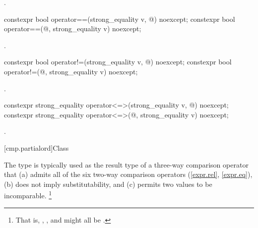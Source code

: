 \begin{itemdescr}
\pnum
\returns
{}.
\end{itemdescr}

%
\begin{itemdecl}
constexpr bool operator==(strong_equality v, @\unspec@) noexcept;
constexpr bool operator==(@\unspec@, strong_equality v) noexcept;
\end{itemdecl}

\begin{itemdescr}
\pnum
\returns
{}.
\end{itemdescr}

%
\begin{itemdecl}
constexpr bool operator!=(strong_equality v, @\unspec@) noexcept;
constexpr bool operator!=(@\unspec@, strong_equality v) noexcept;
\end{itemdecl}

\begin{itemdescr}
\pnum
\returns
{}.
\end{itemdescr}

%
\begin{itemdecl}
constexpr strong_equality operator<=>(strong_equality v, @\unspec@) noexcept;
constexpr strong_equality operator<=>(@\unspec@, strong_equality v) noexcept;
\end{itemdecl}

\begin{itemdescr}
\pnum
\returns
{}.
\end{itemdescr}

[cmp.partialord]{Class }

\pnum
The  type is typically used
as the result type of a three-way comparison operator
that (a) admits all of the six two-way comparison operators (\ref{expr.rel}, \ref{expr.eq}),
(b) does not imply substitutability,
and (c) permits two values to be incomparable.%
\footnote{That is, , , and  might all be .}

